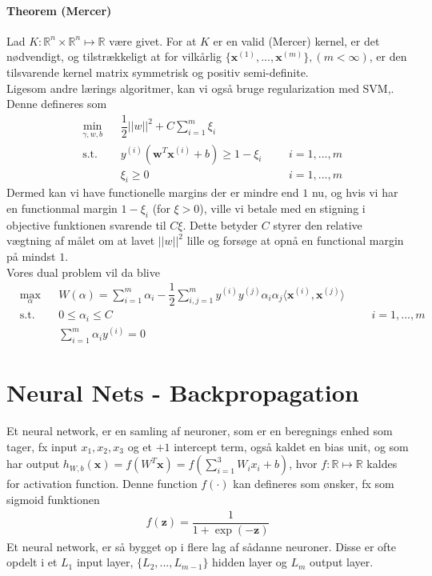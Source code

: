 \documentclass[paper=a4, fontsize=11pt]{scrartcl} %
\numberwithin{equation}{section} %
\numberwithin{figure}{section} %
\numberwithin{table}{section} %
\begin{document}
	\paragraph{\textbf{Theorem (Mercer)}} Lad $K:\mathbb{R}^n\times\mathbb{R}^n\mapsto\mathbb{R}$ være givet. For at $K$ er en valid (Mercer) kernel, er det nødvendigt, og tilstrækkeligt at for vilkårlig $\{\mathbf{x}^{(1)},...,\mathbf{x}^{(m)}\}, (m<\infty)$, er den tilsvarende kernel matrix symmetrisk og positiv semi-definite. \\
	
	Ligesom andre lærings algoritmer, kan vi også bruge regularization med SVM,. Denne defineres som
	\begin{align*}
	&\underset{\gamma,w,b}{\min} &&\dfrac{1}{2}||w||^2+C\sum_{i=1}^{m}\xi_i &&&\\
	&\text{s.t.} && y^{(i)}(\mathbf{w}^T\mathbf{x}^{(i)}+b)\geq 1-\xi_i &&& i=1,...,m \\
	& &&\xi_i \geq0 &&& i=1,...,m	
	\end{align*}
	Dermed kan vi have functionelle margins der er mindre end $1$ nu, og hvis vi har en functionmal margin $1-\xi_i$ (for $\xi>0$), ville vi betale med en stigning i objective funktionen svarende til $C\xi$. Dette betyder $C$ styrer den relative vægtning af målet om at lavet $||w||^2$ lille og forsøge at opnå en functional margin på mindst $1$. \\
	
	Vores dual problem vil da blive
	\begin{align*}
	& \underset{\alpha}{\max} && W(\alpha)=\sum_{i=1}^{m}\alpha_i-\dfrac{1}{2}\sum_{i,j=1}^{m}y^{(i)}y^{(j)}\alpha_i\alpha_j\langle\mathbf{x}^{(i)},\mathbf{x}^{(j)}\rangle &&& \\
	& \text{s.t.} && 0\leq \alpha_i\leq C &&& i=1,...,m \\
	& && \sum_{i=1}^{m}\alpha_iy^{(i)}=0 &&&
	\end{align*}
	
	\newpage
	
	\section*{Neural Nets - Backpropagation}
	
	Et neural network, er en samling af neuroner, som er en beregnings enhed som tager, fx input $x_1,x_2,x_3$ og et $+1$ intercept term, også kaldet en bias unit, og som har output $h_{W,b}(\mathbf{x})=f(W^T\mathbf{x})=f(\sum_{i=1}^{3}W_ix_i+b)$, hvor $f:\mathbb{R}\mapsto\mathbb{R}$ kaldes for activation function. Denne function $f(\cdot)$ kan defineres som ønsker, fx som sigmoid funktionen
	\begin{align*}
	f(\mathbf{z})=\dfrac{1}{1+\exp(-\mathbf{z})}
	\end{align*}
	Et neural network, er så bygget op i flere lag af sådanne neuroner. Disse er ofte opdelt i et $L_1$ input layer, $\{L_2,...,L_{m-1}\}$  hidden layer og $L_m$ output layer. \\
	
\end{document}
